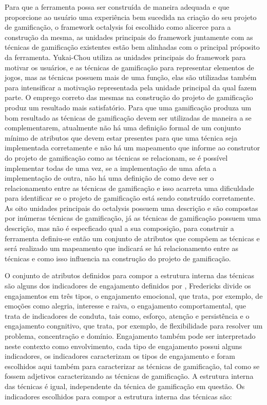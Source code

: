 Para que a ferramenta possa ser construída de maneira adequada e que proporcione ao usuário uma experiência bem sucedida na criação do seu projeto de gamificação, o framework octalysis foi escolhido como alicerce para a construção da mesma, as unidades principais do framework juntamente com as técnicas de gamificação existentes estão bem alinhadas com o principal próposito da ferramenta. Yukai-Chou utiliza as unidades principais do framework para motivar os usuários, e as técnicas de gamificação para representar elementos de jogos, mas as técnicas possuem mais de uma função, elas são utilizadas também para intensificar a motivação representada pela unidade principal da qual fazem parte. O emprego correto das mesmas na construção do projeto de gamificação produz um resultado mais satisfatório. Para que uma gamificação produza um bom resultado as técnicas de gamificação devem ser utilizadas de maneira a se complementarem, atualmente não há uma definição formal de um conjunto mínimo de atributos que devem estar presentes para que uma técnica seja implementada corretamente e não há um mapeamento que informe ao construtor do projeto de gamificação como as técnicas se relacionam, se é possível implementar todas de uma vez, se a implementação de uma afeta a implementação de outra, não há uma definição de como deve ser o relacionamento entre as técnicas de gamificação e isso acarreta uma dificuldade para identificar se o projeto de gamificação está sendo construído corretamente. As oito unidades principais do octalysis possuem uma descrição e são compostas por inúmeras técnicas de gamificação, já as técnicas de gamificação possuem uma descrição, mas não é especficado qual a sua composição, para construir a ferramenta definiu-se então um conjunto de atributos que compõem as técnicas e será realizado um mapeamento que indicará se há relacionamento entre as técnicas e como isso influencia na construção do projeto de gamificação.  

O conjunto de atributos definidos para compor a estrutura interna das técnicas são alguns dos indicadores de engajamento definidos por \cite{fredericks2004}, Fredericks divide os engajamentos em três tipos, o engajamento emocional, que trata, por exemplo, de emoções como alegria, interesse e raiva, o engajamento comportamental, que trata de indicadores de conduta, tais como, esforço, atenção e persistência e o engajamento congnitivo, que trata, por exemplo, de flexibilidade para resolver um problema, concentração e domínio. Engajamento também pode ser interpretado neste contexto como envolvimento, cada tipo de engajamento possui alguns indicadores, os indicadores caracterizam os tipos de engajamento e foram escolhidos aqui também para caracterizar as técnicas de gamificação, tal como se fossem adjetivos caracterizando as técnicas de gamificação.  A estrutura interna das técnicas é igual, independente da técnica de gamificação em questão. Os indicadores escolhidos para compor a estrutura interna das técnicas são: 

